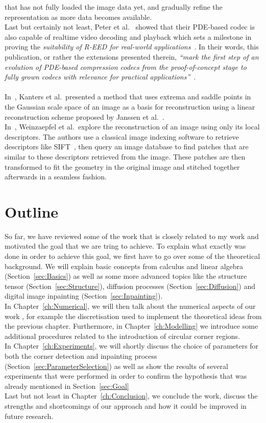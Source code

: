 that has not fully loaded the image data yet, and gradually refine the representation as more data
becomes available. \\
Last but certainly not least, Peter et al.~\cite{peter15} showed that their PDE-based codec is also
capable of realtime video decoding and playback which sets a milestone in proving the
\textit{suitability of R-EED for real-world applications}~\cite{peter15}. In their words, this
publication, or rather the extensions presented therein, \textit{\enquote{mark the first step of an evolution of
PDE-based compression codecs from the proof-of-concept stage to fully grown codecs with relevance
for practical applications}}~\cite{peter15}.\\
\\
In~\cite{kanters05}, Kanters et al.\ presented a method that uses extrema and saddle points in the Gaussian
scale space of an image as a basis for reconstruction using a linear reconstruction scheme proposed
by Janssen et al.~\cite{janssen05}.\\
In~\cite{weinzaepfel11}, Weinzaepfel et al.\ explore the reconstruction of an image using only its local
descriptors. The authors use a classical image indexing software to retrieve descriptors like
SIFT~\cite{sift}, then query an image database to find patches that are similar to these descriptors
retrieved from the image. These patches are then transformed to fit the geometry in the original
image and stitched together afterwards in a seamless fashion.
\newpage\noindent
\section{Outline}
So far, we have reviewed some of the work that is closely related to my work and 
motivated the goal that we are tring to achieve.
To explain what exactly was done in order to achieve this goal, we first have to go over some of the
theoretical background. We will explain basic concepts from
calculus and linear algebra (Section~\ref{sec:Basics}) as well as some more advanced topics
like the structure tensor (Section~\ref{sec:Structure}), diffusion processes (Section~\ref{sec:Diffusion}) and
digital image inpainting (Section~\ref{sec:Inpainting}).\\
In Chapter~\ref{ch:Numerical}, we will then talk about the numerical aspects of our work
, for example the discretisation used to implement the theoretical ideas from 
the previous chapter.
Furthermore, in Chapter~\ref{ch:Modelling} we introduce some additional procedures related to the 
introduction of circular corner regions.\\
In Chapter~\ref{ch:Experiments}, we will shortly discuss the choice of parameters for both the
corner detection and inpainting process (Section~\ref{sec:ParameterSelection}) as well as show 
the results of several experiments that were performed in order to confirm the hypothesis that was
already mentioned in Section~\ref{sec:Goal} \\
Last but not least in Chapter~\ref{ch:Conclusion}, we conclude the work, discuss the strengths
and shortcomings of our approach and how it could be improved in future research.
